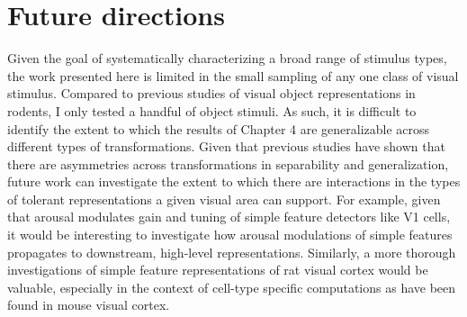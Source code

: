 \section{Future directions}
Given the goal of systematically characterizing a broad range of stimulus types, the work presented here is limited in the small sampling of any one class of visual stimulus. Compared to previous studies of visual object representations in rodents, I only tested a handful of object stimuli. As such, it is difficult to identify the extent to which the results of Chapter 4 are generalizable across different types of transformations. Given that previous studies have shown that there are asymmetries across transformations in separability and generalization, future work can investigate the extent to which there are interactions in the types of tolerant representations a given visual area can support. For example, given that arousal modulates gain and tuning of simple feature detectors like V1 cells, it would be interesting to investigate how arousal modulations of simple features propagates to downstream, high-level representations. Similarly, a more thorough investigations of simple feature representations of rat visual cortex would be valuable, especially in the context of cell-type specific computations as have been found in mouse visual cortex.

